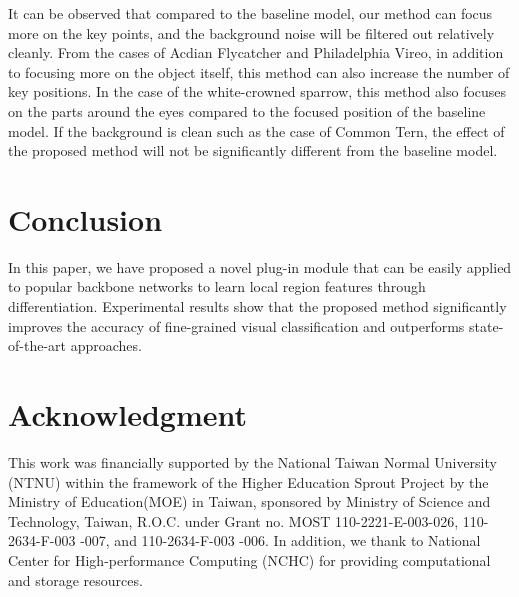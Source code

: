 \documentclass[conference]{IEEEtran}
\begin{document}
It can be observed that compared to the baseline model, our method can focus more on the key points, and the background noise will be filtered out relatively cleanly. From the cases of Acdian Flycatcher and Philadelphia Vireo, in addition to focusing more on the object itself, this method can also increase the number of key positions. In the case of the white-crowned sparrow, this method also focuses on the parts around the eyes compared to the focused position of the baseline model. If the background is clean such as the case of Common Tern, the effect of the proposed method will not be significantly different from the baseline model.


\section{Conclusion}

In this paper, we have proposed a novel plug-in module that can be easily applied to popular backbone networks to learn local region features through differentiation. Experimental results show that the proposed method significantly improves the accuracy of fine-grained visual classification and outperforms state-of-the-art approaches. 


\section*{Acknowledgment}

This work was financially supported by the National Taiwan Normal University (NTNU) within the framework of the Higher Education Sprout Project by the Ministry of Education(MOE) in Taiwan, sponsored by Ministry of Science and Technology, Taiwan, R.O.C. under Grant no. MOST 110-2221-E-003-026, 110-2634-F-003 -007, and 110-2634-F-003 -006. In addition, we thank to National Center for High-performance Computing (NCHC) for providing computational and storage resources.



\end{document}
